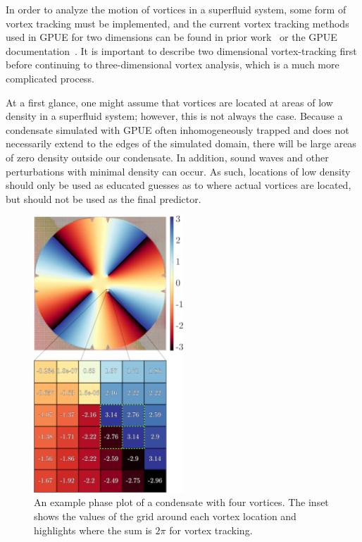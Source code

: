 In order to analyze the motion of vortices in a superfluid system, some form of vortex tracking must be implemented, and the current vortex tracking methods used in GPUE for two dimensions can be found in prior work~\cite{o2017} or the GPUE documentation~\cite{docs}.
It is important to describe two dimensional vortex-tracking first before continuing to three-dimensional vortex analysis, which is a much more complicated process.

At a first glance, one might assume that vortices are located at areas of low density in a superfluid system; however, this is not always the case.
Because a condensate simulated with GPUE often inhomogeneously trapped and does not necessarily extend to the edges of the simulated domain, there will be large areas of zero density outside our condensate.
In addition, sound waves and other perturbations with minimal density can occur.
As such, locations of low density should only be used as educated guesses as to where actual vortices are located, but should not be used as the final predictor.

\begin{figure}
\center \includegraphics[width = 0.5\textwidth]{data/gpu/vortex_tracking/phi_grid.png}
\caption{An example phase plot of a condensate with four vortices.
The inset shows the values of the grid around each vortex location and highlights where the sum is $2\pi$ for vortex tracking.
}
\label{fig:phase}
\end{figure}


